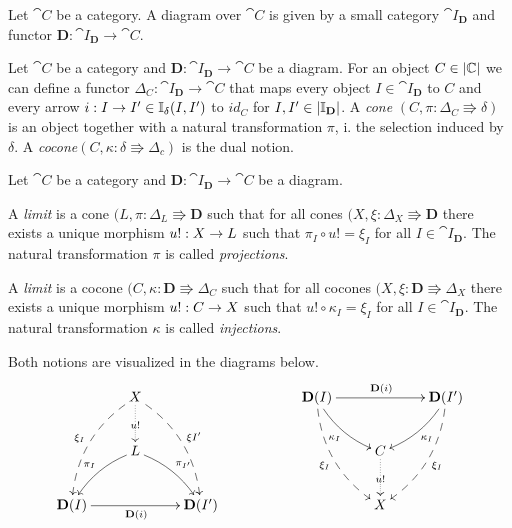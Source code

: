 \begin{mydef}[Diagram]
	Let $\cat{C}$ be a category. 
	A diagram over $\cat{C}$ is given by a small category $\cat{I}_\mathbf{D}$ and functor $\mathbf{D}: \cat{I}_\mathbf{D} \to \cat{C}$.
\end{mydef}


\begin{mydef}[(Co-)Cone]
	Let $\cat{C}$ be a category and $\mathbf{D}: \cat{I}_\mathbf{D} \to \cat{C}$ be a diagram.
	For an object $C \in \catObjects{\cat{C}}$ we can define a functor $\Delta_C: \cat{I}_\mathbf{D} \to \cat{C}$ that maps every object $I \in \cat{I}_\mathbf{D}$ to $C$ and every arrow $\arrow{I}{i}{I'} \in \cat{I}_\delta(I,I')$ to $id_C$ for $I, I' \in \catObjects{\cat{I}_\mathbf{D}}$.
	A \emph{cone} $(C, \pi: \Delta_C \Rrightarrow \delta)$ is an object together with a natural transformation $\pi$, i. the selection induced by $\delta$.
	A \emph{cocone}$(C, \kappa: \delta \Rrightarrow \Delta_c)$ is the dual notion.
\end{mydef}

\begin{mydef}[(Co-)Limit]
	Let $\cat{C}$ be a category and $\mathbf{D}: \cat{I}_\mathbf{D} \to \cat{C}$ be a diagram.
	
	A \emph{limit} is a cone $(L, \pi: \Delta_L \Rrightarrow \mathbf{D}$ such that for all cones $(X, \xi: \Delta_X \Rrightarrow \mathbf{D}$ there exists a unique morphism $\arrow{X}{u!}{L}$ such that $\pi_I \circ u! = \xi_I$ for all $I \in \cat{I}_\mathbf{D}$.
	The natural transformation $\pi$ is called \emph{projections}.
	
	A \emph{limit} is a cocone $(C, \kappa: \mathbf{D} \Rrightarrow \Delta_C$ such that for all cocones $(X, \xi: \mathbf{D} \Rrightarrow \Delta_X$ there exists a unique morphism $\arrow{C}{u!}{X}$ such that $u! \circ \kappa_I = \xi_I$ for all $I \in \cat{I}_\mathbf{D}$.
	The natural transformation $\kappa$ is called \emph{injections}.
	
	Both notions are visualized in the diagrams below.
	\[
	\xymatrix{
		& X \ar@{-->}@/_1pc/[ddl]_{\xi_I} \ar@{-->}@/^1pc/[ddr]^{\xi{I'}} \ar@{.>}[d]|{u!} & & &
		\mathbf{D}(I) \ar@/_0.5pc/[dr]_{\kappa_I} \ar@{-->}@/_1pc/[ddr]_{\xi_I} \ar[rr]^{\mathbf{D}(i)} & & \mathbf{D}(I') \ar@/^0.5pc/[dl]^{\kappa_I} \ar@{-->}@/^1pc/[ddl]^{\xi_I}\\
		& L \ar@/_0.5pc/[dl]_{\pi_I} \ar@/^0.5pc/[dr]^{\pi_{I'}} & & 
		& & C \ar@{.>}[d]|{u!} & \\
		\mathbf{D}(I) \ar[rr]_{\mathbf{D}(i)} & & \mathbf{D}(I') & &
		& X &
	}
	\]
\end{mydef}


